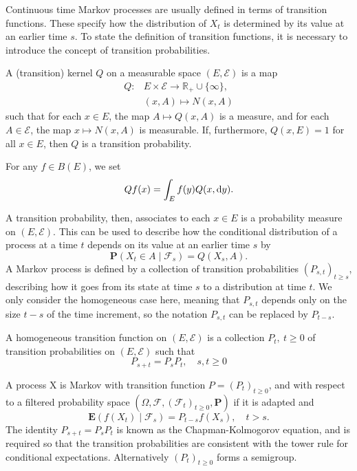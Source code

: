 Continuous time Markov processes are usually defined in terms of transition functions. These specify how the distribution of \(X_t\) is determined by its value at an earlier time \(s\). To state the definition of transition functions, it is necessary to introduce the concept of transition probabilities.
\begin{definition}
    A (transition) kernel \(Q\) on a measurable space \((E,\mathcal{E})\) is a map
    \begin{align*}
        Q: &E\times\mathcal{E}\rightarrow{\mathbb R}_+\cup\{\infty\},\\ 
        & (x,A)\mapsto N(x,A)
    \end{align*}
    such that for each \(x\in E\), the map \(A\mapsto Q(x,A)\) is a measure, and for each \(A\in\mathcal{E}\), the map \(x\mapsto N(x,A)\) is measurable. If, furthermore, \(Q(x,E)=1\) for all \(x\in E\), then \(Q\) is a transition probability.
\end{definition}
For any \(f\in B(E)\), we set 
\[
Qf(x)= \int_{E} f(y)Q(x, \text{\rm{d}} y). 
\]

A transition probability, then, associates to each \(x\in E\) is a probability measure on \((E,\mathcal{E})\). This can be used to describe how the conditional distribution of a process at a time \(t\) depends on its value at an earlier time \(s\) by 
\[
{\mathbf P}(X_t\in A\mid\mathcal{F}_s)=Q(X_s,A). 
\]
A Markov process is defined by a collection of transition probabilities \((P_{s,t})_{t\geq s}\), describing how it goes from its state at time \(s\) to a distribution at time \(t\). We only consider the homogeneous case here, meaning that \(P_{s,t}\) depends only on the size \(t-s\) of the time increment, so the notation \(P_{s,t}\) can be replaced by \(P_{t-s}\). %
\begin{definition}
    A homogeneous transition function on \((E,\mathcal{E})\) is a collection \(P_t, ~ t\ge 0\) of transition probabilities on \((E,\mathcal{E})\) such that 
    \[
    P_{s+t}=P_sP_t, \quad s,t\geq 0
    \]
\end{definition}

A process X is Markov with transition function \(P=(P_t)_{t\geq 0}\), and with respect to a filtered probability space \({(\Omega,\mathcal{F},(\mathcal{F}_t)_{t\ge 0},{\mathbf P})} \) if it is adapted and
\[
{\mathbf E}\left(f(X_t)\mid\mathcal{F}_s\right)=P_{t-s}f(X_s), \quad t>s.  
\]
The identity \({P_{s+t}=P_sP_t}\) is known as the Chapman-Kolmogorov equation, and is required so that the transition probabilities are consistent with the tower rule for conditional expectations. Alternatively \((P_t)_{t\geq 0}\) forms a semigroup.

